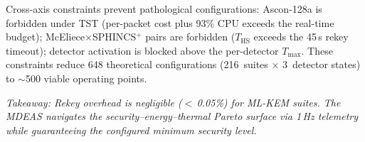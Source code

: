 Cross-axis constraints prevent pathological configurations:
Ascon-128a is forbidden under TST (per-packet cost plus 93\% CPU
exceeds the real-time budget); McEliece$\times$SPHINCS$^+$ pairs
are forbidden ($T_\text{HS}$ exceeds the 45\,s rekey timeout);
detector activation is blocked above the per-detector $T_\text{max}$.
These constraints reduce 648 theoretical configurations
(216~suites $\times$ 3~detector states) to $\sim$500 viable
operating points.

\emph{Takeaway: Rekey overhead is negligible ($<$\,0.05\%) for
ML-KEM suites.  The MDEAS navigates the security--energy--thermal
Pareto surface via 1\,Hz telemetry while guaranteeing the
configured minimum security level.}
